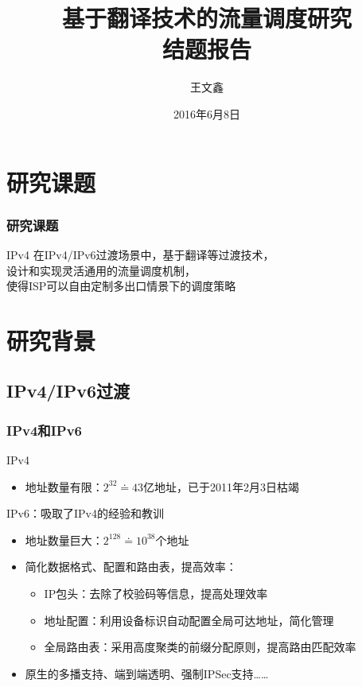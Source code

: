 \documentclass{beamer}
\title{
  基于翻译技术的流量调度研究 \\
  结题报告
}
\author{王文鑫}
\date{2016年6月8日}
\begin{document}
\begin{frame}
  \titlepage
\end{frame}

\section{研究课题}

\begin{frame}
  \frametitle{研究课题}

  \begin{block}{IPv4}
  在IPv4/IPv6过渡场景中，基于翻译等过渡技术，\\设计和实现灵活通用的流量调度机制，\\
  使得ISP可以自由定制多出口情景下的调度策略
  \end{block}
\end{frame}

\section{研究背景}
\subsection{IPv4/IPv6过渡}
\begin{frame}
  \frametitle{IPv4和IPv6}

  \begin{block}{IPv4}
    \begin{itemize}
    \item 地址数量有限：$2^{32} \doteq 43$亿地址，已于2011年2月3日枯竭\footnotemark[1]
    \end{itemize}
  \end{block}

  \begin{block}{IPv6：吸取了IPv4的经验和教训}
    \begin{itemize}
    \item 地址数量巨大：$2^{128} \doteq 10^{38}$个地址
    \item 简化数据格式、配置和路由表，提高效率：
      \begin{itemize}
      \item IP包头：去除了校验码等信息，提高处理效率
      \item 地址配置：利用设备标识自动配置全局可达地址，简化管理
      \item 全局路由表：采用高度聚类的前缀分配原则，提高路由匹配效率
      \end{itemize}
    \item 原生的多播支持、端到端透明、强制IPSec支持……
    \end{itemize}
  \end{block}
\end{frame}
\end{document}
